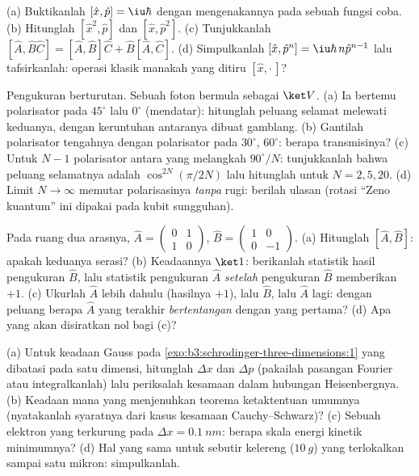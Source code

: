 \begin{exercise}[$\star$]\label{exo:b3:quantum-formalism:4}
(a) Buktikanlah $[\hat x, \hat p] = \iu\hbar$ dengan mengenakannya pada
sebuah fungsi coba. (b) Hitunglah $[\hat x^2, \hat p]$ dan $[\hat x, \hat p^2]$.
(c) Tunjukkanlah $[\hat A, \hat B\hat C] = [\hat A, \hat B]\hat C + \hat B[\hat A,
\hat C]$. (d) Simpulkanlah $[\hat x, \hat p^n] = \iu\hbar\,n\hat p^{n-1}$
lalu tafsirkanlah: operasi klasik manakah yang ditiru $[\hat x, \cdot\,]$?
\end{exercise}

\begin{exercise}[$\star\star$]\label{exo:b3:quantum-formalism:5}
Pengukuran berturutan. Sebuah foton bermula sebagai $\ket V$. (a) Ia
bertemu polarisator pada $45^\circ$ lalu $0^\circ$ (mendatar):
hitunglah peluang selamat melewati keduanya, dengan keruntuhan
antaranya dibuat gamblang. (b) Gantilah polarisator tengahnya dengan
polarisator pada $30^\circ$, $60^\circ$: berapa transmisinya? (c) Untuk
$N - 1$ polarisator antara yang melangkah $90^\circ/N$: tunjukkanlah
bahwa peluang selamatnya adalah $\cos^{2N}(\pi/2N)$ lalu hitunglah untuk
$N = 2, 5, 20$. (d) Limit $N \to \infty$ memutar polarisasinya
\emph{tanpa} rugi: berilah ulasan (rotasi ``Zeno kuantum'' ini dipakai
pada kubit sungguhan).
\end{exercise}

\begin{exercise}[$\star\star$]\label{exo:b3:quantum-formalism:6}
Pada ruang dua arasnya, $\hat A = \begin{pmatrix}0&1\\1&0
\end{pmatrix}$, $\hat B = \begin{pmatrix}1&0\\0&-1\end{pmatrix}$.
(a) Hitunglah $[\hat A, \hat B]$: apakah keduanya serasi? (b)
Keadaannya $\ket1$: berikanlah statistik hasil pengukuran $\hat B$,
lalu statistik pengukuran $\hat A$ \emph{setelah} pengukuran $\hat B$
memberikan $+1$. (c) Ukurlah $\hat A$ lebih dahulu (hasilnya $+1$),
lalu $\hat B$, lalu $\hat A$ lagi: dengan peluang berapa $\hat A$ yang
terakhir \emph{bertentangan} dengan yang pertama? (d) Apa yang akan
disiratkan  nol bagi (c)?
\end{exercise}

\begin{exercise}[$\star\star$]\label{exo:b3:quantum-formalism:7}
(a) Untuk keadaan Gauss pada
\cref{exo:b3:schrodinger-three-dimensions:1} yang dibatasi pada satu
dimensi, hitunglah $\Delta x$ dan $\Delta p$ (pakailah pasangan Fourier
atau integralkanlah) lalu periksalah kesamaan dalam hubungan
Heisenbergnya. (b) Keadaan mana yang menjenuhkan teorema ketaktentuan
umumnya (nyatakanlah syaratnya dari kasus kesamaan Cauchy--Schwarz)? (c)
Sebuah elektron yang terkurung pada
$\Delta x = \qty{0.1}{nm}$: berapa skala energi kinetik minimumnya? (d)
Hal yang sama untuk sebutir kelereng ($\qty{10}{g}$) yang terlokalkan
sampai satu mikron: simpulkanlah.
\end{exercise}

